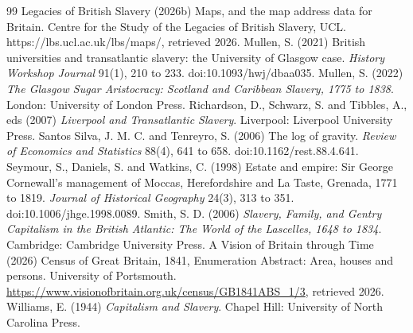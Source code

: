 \documentclass[11pt,a4paper]{article}
\begin{document}
\begin{thebibliography}{99}
 Legacies of British Slavery (2026b) Maps, and the map address data for Britain. Centre for the Study of the Legacies of British Slavery, UCL. https://lbs.ucl.ac.uk/lbs/maps/, retrieved 2026.
 Mullen, S. (2021) British universities and transatlantic slavery: the University of Glasgow case. \textit{History Workshop Journal} 91(1), 210 to 233. doi:10.1093/hwj/dbaa035.
 Mullen, S. (2022) \textit{The Glasgow Sugar Aristocracy: Scotland and Caribbean Slavery, 1775 to 1838}. London: University of London Press.
 Richardson, D., Schwarz, S. and Tibbles, A., eds (2007) \textit{Liverpool and Transatlantic Slavery}. Liverpool: Liverpool University Press.
 Santos Silva, J. M. C. and Tenreyro, S. (2006) The log of gravity. \textit{Review of Economics and Statistics} 88(4), 641 to 658. doi:10.1162/rest.88.4.641.
 Seymour, S., Daniels, S. and Watkins, C. (1998) Estate and empire: Sir George Cornewall's management of Moccas, Herefordshire and La Taste, Grenada, 1771 to 1819. \textit{Journal of Historical Geography} 24(3), 313 to 351. doi:10.1006/jhge.1998.0089.
 Smith, S. D. (2006) \textit{Slavery, Family, and Gentry Capitalism in the British Atlantic: The World of the Lascelles, 1648 to 1834}. Cambridge: Cambridge University Press.
 A Vision of Britain through Time (2026) Census of Great Britain, 1841, Enumeration Abstract: Area, houses and persons. University of Portsmouth. \url{https://www.visionofbritain.org.uk/census/GB1841ABS_1/3}, retrieved 2026.
 Williams, E. (1944) \textit{Capitalism and Slavery}. Chapel Hill: University of North Carolina Press.
\end{thebibliography}

\appendix
\end{document}
